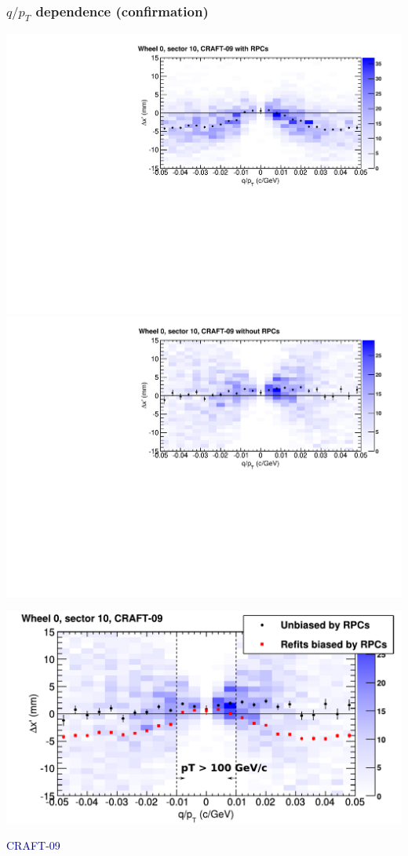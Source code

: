 \documentclass[compress]{beamer}
\begin{document}
\begin{frame}
\frametitle{$q/p_T$ dependence (confirmation)}
\vspace{-0.6 cm}
\includegraphics[width=0.5\linewidth]{globaldistort_withRPC.pdf}
\includegraphics[width=0.5\linewidth]{globaldistort_noRPC.pdf}

\includegraphics[width=\linewidth]{globaldistort_compare.pdf}

\vspace{-1.5 cm}
\hspace{0.93\linewidth} \textcolor{darkblue}{\mbox{\scriptsize CRAFT-09\hspace{-3 cm}}}
\end{frame}
\end{document}
